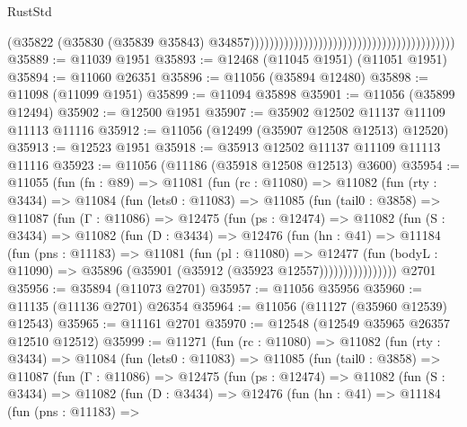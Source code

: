 \begin{lexlean}{RustStd}
\begin{coremodule}
                                                                                    (@35822
                                                                                      (@35830
                                                                                        (@35839
                                                                                          @35843)
                                                                                        @34857))))))))))))))))))))))))))))))))))))))))))
@35889 := @11039 @1951
@35893 := @12468 (@11045 @1951) (@11051 @1951)
@35894 := @11060 @26351
@35896 := @11056 (@35894 @12480)
@35898 := @11098 (@11099 @1951)
@35899 := @11094 @35898
@35901 := @11056 (@35899 @12494)
@35902 := @12500 @1951
@35907 := @35902 @12502 @11137 @11109 @11113 @11116
@35912 := @11056 (@12499 (@35907 @12508 @12513) @12520)
@35913 := @12523 @1951
@35918 := @35913 @12502 @11137 @11109 @11113 @11116
@35923 := @11056 (@11186 (@35918 @12508 @12513) @3600)
@35954 := @11055
    (fun (fn : @89) =>
    @11081
      (fun (rc : @11080) =>
      @11082
        (fun (rty : @3434) =>
        @11084
          (fun (lets0 : @11083) =>
          @11085
            (fun (tail0 : @3858) =>
            @11087
              (fun (Γ : @11086) =>
              @12475
                (fun (ps : @12474) =>
                @11082
                  (fun (S : @3434) =>
                  @11082
                    (fun (D : @3434) =>
                    @12476
                      (fun (hn : @41) =>
                      @11184
                        (fun (pns : @11183) =>
                        @11081
                          (fun (pl : @11080) =>
                          @12477
                            (fun (bodyL : @11090) =>
                            @35896 (@35901 (@35912 (@35923 @12557))))))))))))))))
    @2701
@35956 := @35894 (@11073 @2701)
@35957 := @11056 @35956
@35960 := @11135 (@11136 @2701) @26354
@35964 := @11056 (@11127 (@35960 @12539) @12543)
@35965 := @11161 @2701
@35970 := @12548 (@12549 @35965 @26357 @12510 @12512)
@35999 := @11271
    (fun (rc : @11080) =>
    @11082
      (fun (rty : @3434) =>
      @11084
        (fun (lets0 : @11083) =>
        @11085
          (fun (tail0 : @3858) =>
          @11087
            (fun (Γ : @11086) =>
            @12475
              (fun (ps : @12474) =>
              @11082
                (fun (S : @3434) =>
                @11082
                  (fun (D : @3434) =>
                  @12476
                    (fun (hn : @41) =>
                    @11184
                      (fun (pns : @11183) =>

\end{coremodule}
\end{lexlean}
